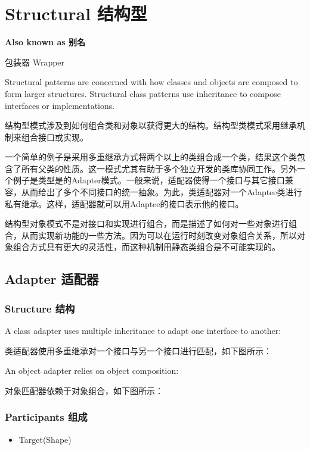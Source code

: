 \chapter{Structural 结构型}

\textbf{Also known as 别名}

包装器 Wrapper


Structural patterns are concerned with how classes and objects are composed to form larger structures. Structural class patterns use inheritance to compose interfaces or implementations.

结构型模式涉及到如何组合类和对象以获得更大的结构。结构型类模式采用继承机制来组合接口或实现。

一个简单的例子是采用多重继承方式将两个以上的类组合成一个类，结果这个类包含了所有父类的性质。这一模式尤其有助于多个独立开发的类库协同工作。另外一个例子是类型是的Adapter模式。一般来说，适配器使得一个接口与其它接口兼容，从而给出了多个不同接口的统一抽象。为此，类适配器对一个Adaptee类进行私有继承。这样，适配器就可以用Adaptee的接口表示他的接口。

结构型对象模式不是对接口和实现进行组合，而是描述了如何对一些对象进行组合，从而实现新功能的一些方法。因为可以在运行时刻改变对象组合关系，所以对象组合方式具有更大的灵活性，而这种机制用静态类组合是不可能实现的。


\section{Adapter 适配器}

\subsection{Structure 结构}

A class adapter uses multiple inheritance to adapt one interface to another:

类适配器使用多重继承对一个接口与另一个接口进行匹配，如下图所示：


An object adapter relies on object composition:

对象匹配器依赖于对象组合，如下图所示：


\subsection{Participants 组成}

\begin{itemize}

\item Target(Shape)



\end{itemize}
